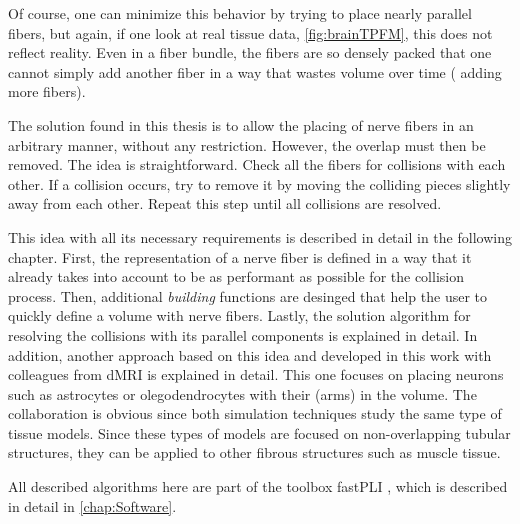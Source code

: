 Of course, one can minimize this behavior by trying to place nearly parallel fibers, but again, if one look at real tissue data, \eg{} \cref{fig:brainTPFM}, this does not reflect reality.
Even in a fiber bundle, the fibers are so densely packed that one cannot simply add another fiber in a way that wastes volume over time (\ie{} adding more fibers).
\par
%
The solution found in this thesis is to allow the placing of nerve fibers in an arbitrary manner, without any restriction.
However, the overlap must then be removed.
The idea is straightforward.
Check all the fibers for collisions with each other.
If a collision occurs, try to remove it by moving the colliding pieces slightly away from each other.
Repeat this step until all collisions are resolved.
\par
%
This idea \cite{Matuschke2019} with all its necessary requirements is described in detail in the following chapter.
First, the representation of a nerve fiber is defined in a way that it already takes into account to be as performant as possible for the collision process.
Then, additional \textit{building} functions are desinged that help the user to quickly define a volume with nerve fibers.
Lastly, the solution algorithm for resolving the collisions with its parallel components is explained in detail.
In addition, another approach based on this idea and developed in this work with colleagues from \ac{dMRI} is explained in detail.
This one focuses on placing neurons such as astrocytes or olegodendrocytes with their (arms) in the volume.
The collaboration is obvious since both simulation techniques study the same type of tissue models.
Since these types of models are focused on non-overlapping tubular structures, they can be applied to other fibrous structures such as muscle tissue.
\par
%
All described algorithms here are part of the toolbox \ac{fastPLI} \cite{Matuschke2021}, which is described in detail in \cref{chap:Software}.
%
%
%
